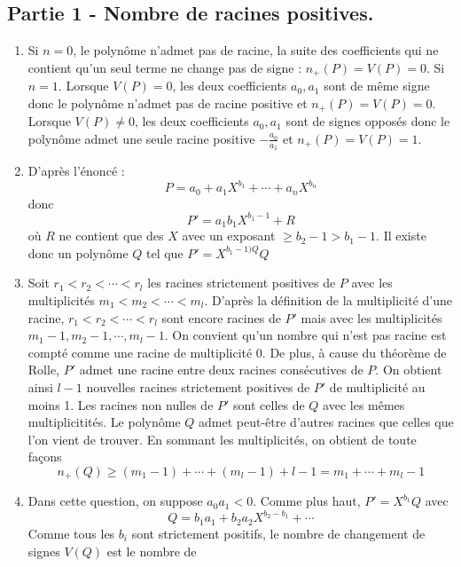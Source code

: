 \subsection*{Partie 1 - Nombre de racines positives.}
\begin{enumerate}
  \item Si $n=0$, le polyn{\^o}me n'admet pas de racine, la suite des coefficients qui ne contient qu'un seul terme ne change pas de signe : $n_+(P)=V(P)=0$.\newline
  Si $n=1$. Lorsque $V(P)=0$, les deux coefficients $a_0,a_1$ sont de m{\^e}me signe donc le polyn{\^o}me n'admet pas de racine positive et $n_+(P)=V(P)=0$.\newline
  Lorsque $V(P)\neq 0$, les deux coefficients $a_0,a_1$ sont de signes oppos{\'e}s donc le polyn{\^o}me admet une seule racine positive $-\frac{a_0}{a_1}$ et $n_+(P)=V(P)=1$.
  \item D'apr{\`e}s l'{\'e}nonc{\'e} :
  \[P=a_0 + a_1X^{b_1}+\cdots + a_n X^{b_n}\]
  donc
  \[P'=a_1b_1X^{b_1-1}+ R\]
  o{\`u} $R$ ne contient que des $X$ avec un exposant $\geq b_2-1>b_1-1$. Il
  existe donc un polyn{\^o}me $Q$ tel que $P'=X^{b_1-1)Q}Q$
  \item Soit $r_1<r_2<\cdots<r_l$ les racines strictement
  positives de $P$ avec les multiplicit{\'e}s
  $m_1<m_2<\cdots<m_l$.\newline
  D'apr{\`e}s la d{\'e}finition de la multiplicit{\'e} d'une racine, $r_1<r_2<\cdots<r_l$ sont encore
  racines de $P'$ mais avec les multiplicit{\'e}s
  $m_1-1, m_2-1, \cdots, m_l-1$. On convient qu'un nombre qui n'est
  pas racine est compt{\'e} comme une racine de multiplicit{\'e} 0.
  \newline
  De plus, {\`a} cause du th{\'e}or{\`e}me de Rolle, $P'$ admet une racine
  entre deux racines cons{\'e}cutives de $P$. On obtient ainsi $l-1$
  nouvelles racines strictement positives de $P'$ de multiplicit{\'e} au moins 1.\newline
  Les racines non nulles de $P'$ sont celles de $Q$ avec les m{\^e}mes
  multiplicitit{\'e}s. Le polyn{\^o}me $Q$ admet peut-{\^e}tre d'autres racines que celles que l'on vient
  de trouver. En sommant les multiplicit{\'e}s, on obtient de toute fa\c{c}ons
  \[n_+(Q) \geq (m_1-1)+\cdots+(m_l-1)+l-1=m_1+\cdots+m_l-1\]
  \item Dans cette question, on suppose $a_0a_1<0$.
   Comme plus haut, $P'=X^{b_1}Q$ avec
   \[Q=b_1a_1+b_2a_2X^{b_2-b_1}+\cdots\]
   Comme tous les $b_i$ sont strictement positifs, le nombre de changement de signes $V(Q)$ est le nombre de

\end{enumerate}

